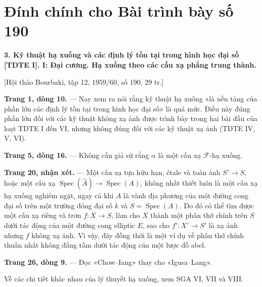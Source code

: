 \clearpage
\chapter*{Đính chính cho Bài trình bày số 190}
\setcounter{footnote}{0}

\noindent\textbf{3. Kỹ thuật hạ xuống và các định lý tồn tại trong hình học
đại số [TDTE I]. I: Đại cương. Hạ xuống theo các cấu xạ phẳng trung thành.}

\begin{center}
[Hội thảo Bourbaki, tập 12, 1959/60, số 190, 29 tr.]
\end{center}

\noindent\textbf{Trang 1, dòng 10.} --- Nay xem ra nói rằng kỹ thuật hạ xuống
«là nền tảng của phần lớn các định lý tồn tại trong hình học đại số» là quá
mức. Điều này đúng phần lớn đối với các kỹ thuật không xạ ảnh được trình bày
trong hai bài đầu của loạt TDTE I đến VI, nhưng không đúng đối với các kỹ
thuật xạ ảnh (TDTE IV, V, VI).

\noindent\textbf{Trang 5, dòng 16.} --- Không cần giả sử rằng $\alpha$ là một
cấu xạ $\mathcal F$-hạ xuống.

\noindent\textbf{Trang 20, nhận xét.} --- Một cấu xạ tựa hữu hạn, étale và
toàn ánh $S'\longrightarrow S$, hoặc một cấu xạ
$\operatorname{Spec}(\widehat A)\longrightarrow\operatorname{Spec}(A)$, không
nhất thiết luôn là một cấu xạ hạ xuống nghiêm ngặt, ngay cả khi $A$ là vành
địa phương của một đường cong đại số trên một trường đóng đại số $k$ và
$S=\operatorname{Spec}(A)$. Do đó có thể tìm được một cấu xạ riêng và trơn
$f:X\longrightarrow S$, làm cho $X$ thành
một phân thớ chính trên $S$ dưới tác động của một đường cong elliptic $E$,
sao cho $f':X'\longrightarrow S'$ là xạ ảnh nhưng $f$ không xạ ảnh. Vì vậy,
đây đồng thời là một ví dụ về phân thớ chính thuần nhất không đẳng tầm dưới
tác động của một lược đồ abel.

\noindent\textbf{Trang 26, dòng 9.} --- Đọc «Chow--Iang» thay cho «Igusa--Lang».

Về các chi tiết khác nhau của lý thuyết hạ xuống, xem SGA VI, VII và VIII.

\par
